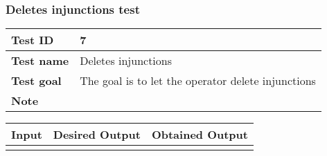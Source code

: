 {{		\subsubsection{Deletes injunctions test}{
			\begin{table}[h]
			\begin{tabular}{|p{4cm}|p{10cm}|}
			\hline
				\centering \vspace{1mm} \bfseries{Test ID} \vspace{1mm} & 
				\vspace{1mm} 7 \vspace{1mm}\\
			\hline
				\centering \vspace{1mm} \bfseries{Test name} \vspace{1mm} & 
				\vspace{1mm} Deletes injunctions \vspace{1mm}\\
			\hline
				\centering \vspace{1mm} \bfseries{Test goal} \vspace{1mm} & 
				\vspace{1mm} The goal is to let the operator delete injunctions\vspace{1mm}\\
			\hline
				\centering \vspace{1mm} \bfseries{Note} \vspace{1mm} & 
				\vspace{1mm}  \vspace{1mm}\\
			\hline
			\end{tabular}
			\end{table}

			\begin{table}[h]
			\begin{tabular}{|p{4cm}|p{5cm}|p{5cm}|}
			\hline
			\centering \vspace{1mm} \bfseries{Input} \vspace{1mm} & \vspace{1mm} \bfseries{Desired Output} \vspace{1mm} & \vspace{1mm} \bfseries{Obtained Output} \vspace{1mm}\\
			\hline
				\vspace{1mm}  \vspace{1mm} &
				\vspace{1mm}  \vspace{1mm} & 
				\vspace{1mm}  \vspace{1mm} \\
			\hline
			\end{tabular}
			\end{table}
		}
		\clearpage

}}
